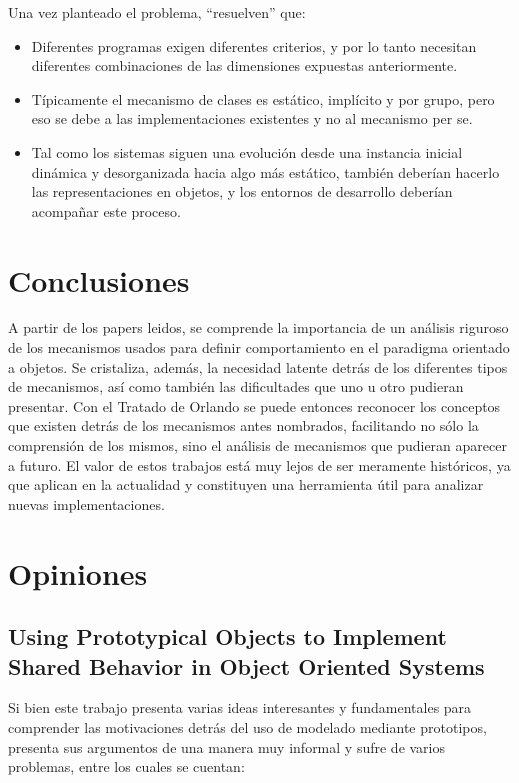 \documentclass[a4paper,10pt]{article}
\begin{document}
Una vez planteado el problema, ``resuelven'' que:
\begin{itemize}
	\item Diferentes programas exigen diferentes criterios, y por lo tanto necesitan diferentes combinaciones de las dimensiones expuestas anteriormente.
	\item Típicamente el mecanismo de clases es estático, implícito y por grupo, pero eso se debe a las implementaciones existentes y no al mecanismo per se.
	\item Tal como los sistemas siguen una evolución desde una instancia inicial dinámica y desorganizada hacia algo más estático, también deberían hacerlo las representaciones en objetos, y los entornos de desarrollo deberían acompañar este proceso.
\end{itemize}

\section{Conclusiones}

A partir de los papers leidos, se comprende la importancia de un análisis riguroso de los mecanismos usados para definir comportamiento en el paradigma orientado a objetos. Se cristaliza, además, la necesidad latente detrás de los diferentes tipos de mecanismos, así como también las dificultades que uno u otro pudieran presentar.
Con el Tratado de Orlando se puede entonces reconocer los conceptos que existen detrás de los mecanismos antes nombrados, facilitando no sólo la comprensión de los mismos, sino el análisis de mecanismos que pudieran aparecer a futuro. El valor de estos trabajos está muy lejos de ser meramente históricos, ya que aplican en la actualidad y constituyen una herramienta útil para analizar nuevas implementaciones.



\section{Opiniones}


\subsection{Using Prototypical Objects to Implement Shared Behavior in Object Oriented Systems}

Si bien este trabajo presenta varias ideas interesantes y fundamentales para comprender las motivaciones detrás del uso de modelado mediante prototipos, presenta sus argumentos de una manera muy informal y sufre de varios problemas, entre los cuales se cuentan:
\end{document}
